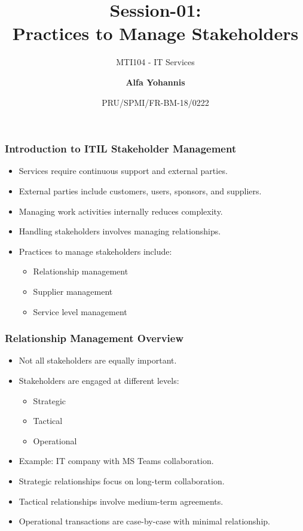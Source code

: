 \documentclass[aspectratio=169, table]{beamer}
\subtitle{MTI104 - IT Services}
\title{Session-01:\\\LARGE{Practices to Manage Stakeholders\\}}
\date[Serial]{\scriptsize {PRU/SPMI/FR-BM-18/0222}}
\author[Pradita]{\small{\textbf{Alfa Yohannis}}}
\begin{document}
\frame{\titlepage}

\begin{frame}
	\frametitle{Introduction to ITIL Stakeholder Management}
	
	\begin{itemize}
		\item Services require continuous support and external parties.
		\item External parties include customers, users, sponsors, and suppliers.
		\item Managing work activities internally reduces complexity.
		\item Handling stakeholders involves managing relationships.
		\item Practices to manage stakeholders include:
		\begin{itemize}
			\item Relationship management
			\item Supplier management
			\item Service level management
		\end{itemize}
	\end{itemize}
	
\end{frame}

\begin{frame}
	\frametitle{Relationship Management Overview}
	
	\begin{itemize}
		\item Not all stakeholders are equally important.
		\item Stakeholders are engaged at different levels:
		\begin{itemize}
			\item Strategic
			\item Tactical
			\item Operational
		\end{itemize}
		\item Example: IT company with MS Teams collaboration.
		\item Strategic relationships focus on long-term collaboration.
		\item Tactical relationships involve medium-term agreements.
		\item Operational transactions are case-by-case with minimal relationship.
	\end{itemize}
	
\end{frame}
\end{document}
